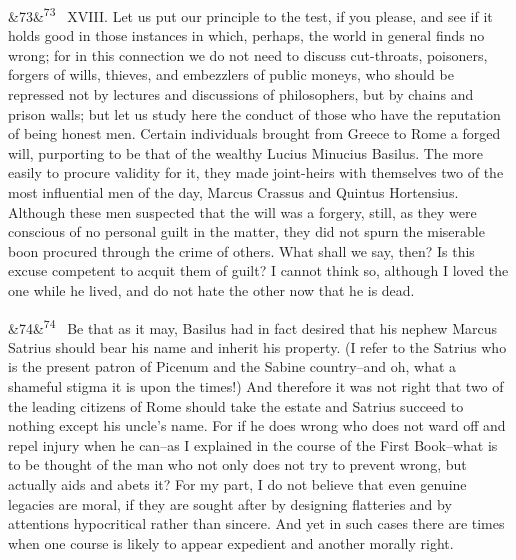 \documentclass[12pt]{article}
\newcommand{\para}[1][]{\par\noindent\ifx&#1&\else\textsuperscript{\footnotesize #1}~\fi}
\begin{document}
\para[73] XVIII. Let us put our principle to the test, if you please, and see if it holds good in those instances in which, perhaps, the world in general finds no wrong; for in this connection we do not need to discuss cut-throats, poisoners, forgers of wills, thieves, and embezzlers of public moneys, who should be repressed not by lectures and discussions of philosophers, but by chains and prison walls; but let us study here the conduct of those who have the reputation of being honest men. Certain individuals brought from Greece to Rome a forged will, purporting to be that of the wealthy Lucius Minucius Basilus. The more easily to procure validity for it, they made joint-heirs with themselves two of the most influential men of the day, Marcus Crassus and Quintus Hortensius. Although these men suspected that the will was a forgery, still, as they were conscious of no personal guilt in the matter, they did not spurn the miserable boon procured through the crime of others. What shall we say, then? Is this excuse competent to acquit them of guilt? I cannot think so, although I loved the one while he lived, and do not hate the other now that he is dead.

\para[74] Be that as it may, Basilus had in fact desired that his nephew Marcus Satrius should bear his name and inherit his property. (I refer to the Satrius who is the present patron of Picenum and the Sabine country--and oh, what a shameful stigma it is upon the times!) And therefore it was not right that two of the leading citizens of Rome should take the estate and Satrius succeed to nothing except his uncle's name. For if he does wrong who does not ward off and repel injury when he can--as I explained in the course of the First Book--what is to be thought of the man who not only does not try to prevent wrong, but actually aids and abets it? For my part, I do not believe that even genuine legacies are moral, if they are sought after by designing flatteries and by attentions hypocritical rather than sincere. And yet in such cases there are times when one course is likely to appear expedient and another morally right.
\end{document}
